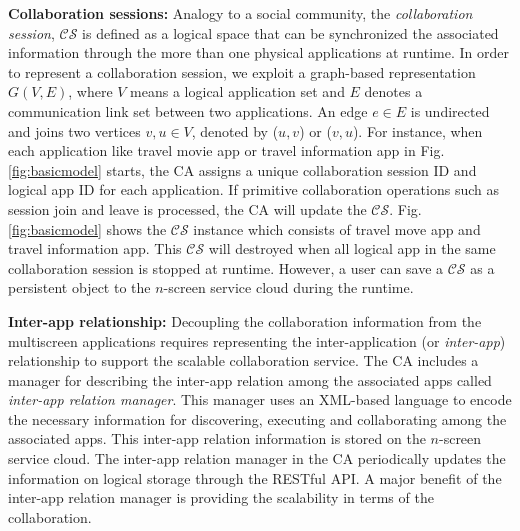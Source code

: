 \documentclass{sig-alternate}
\begin{document}
\noindent
\textbf{Collaboration sessions: }
Analogy to a social community, the \textit{collaboration session}, $\mathcal{CS}$ is defined as a logical space  that can be synchronized the associated information through the more than one physical applications at runtime.
In order to represent a collaboration session, we exploit a graph-based representation $G(V, E)$, where $V$ means a logical application set and $E$ denotes a communication link set between two applications. An edge $e \in E$ is undirected and joins two vertices $v, u \in V$, denoted by ($u, v$) or ($v, u$). 
For instance, 
when each application like travel movie app or travel information app in Fig. \ref{fig:basicmodel} starts, the CA assigns a unique collaboration session ID and logical app ID for each application. If primitive collaboration operations such as session join and leave is processed, the CA will update the $\mathcal{CS}$. Fig. \ref{fig:basicmodel} shows the  $\mathcal{CS}$ instance which consists of travel move app and travel information app. This $\mathcal{CS}$ will destroyed when all logical app in the same collaboration session is stopped at runtime. However, a user can save a $\mathcal{CS}$ as a persistent object to the $n$-screen service cloud during the runtime.

\noindent
\textbf{Inter-app relationship:}
Decoupling the collaboration information from the multiscreen applications requires representing the inter-application (or \textit{inter-app}) relationship to support the scalable collaboration service. The CA includes a manager for describing the inter-app relation among the associated apps called \textit{inter-app relation manager}. This manager uses an XML-based language to encode the necessary information for discovering, executing and collaborating among the associated apps.
This inter-app relation information is stored on the $n$-screen service cloud. The inter-app relation manager in the CA periodically updates the information on logical storage through the RESTful API.
A major benefit of the inter-app relation manager is providing the scalability in terms of the collaboration.
\end{document}
